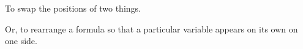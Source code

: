 To swap the positions of two things.
\par
Or, to rearrange a formula so that a particular variable
appears on its own on one side.